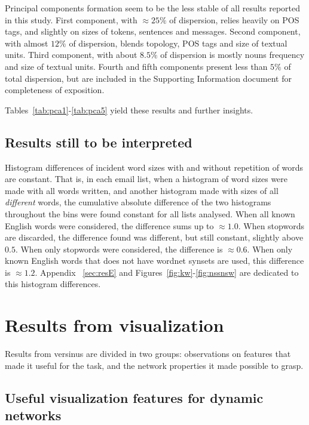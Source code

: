 Principal components formation seem to be the less stable of all results reported in this study.
First component, with $\approx 25\%$ of dispersion, relies heavily on POS tags,
and slightly on sizes of tokens, sentences and messages.
Second component, with almost $12\%$ of dispersion, blends topology, POS tags and size of textual units.
Third component, with about $8.5\%$ of dispersion is mostly nouns frequency and size of textual units.
Fourth and fifth components present less than $5\%$ of total dispersion,
but are included in the Supporting Information document for completeness of exposition.

Tables~\ref{tab:pca1}-\ref{tab:pca5} yield these results and further insights.

\subsection{Results still to be interpreted}\label{subsec:sii}
Histogram differences of incident word sizes with and without repetition of words are constant.
That is, in each email list, when a histogram of word sizes were made with all words written,
and another histogram made with sizes of all \emph{different} words,
the cumulative absolute difference of the two histograms throughout the bins were found constant for all lists analysed.
When all known English words were considered, 
the difference sums up to $\approx 1.0$.
When stopwords are discarded,
the difference found was different, but still constant, slightly above $0.5$.
When only stopwords were considered, the difference is $\approx 0.6$.
When only known English words that does not have wordnet synsets are used,
this difference is $\approx 1.2$.
Appendix ~\ref{sec:resE} and Figures~\ref{fig:kw}-\ref{fig:nssnsw} are dedicated to this histogram differences.

\section{Results from visualization}
Results from versinus are divided in two groups:
observations on features that made it useful for the task,
and the network properties it made possible to grasp.

\subsection{Useful visualization features for dynamic networks}

